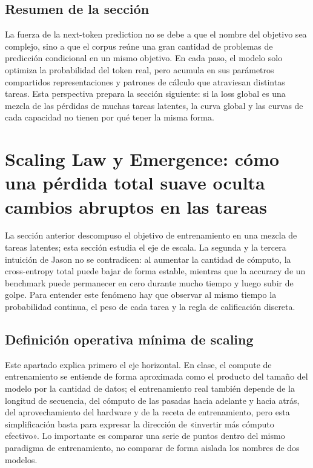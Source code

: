 \documentclass[a4paper]{article}
\begin{document}
\subsection{Resumen de la sección}

La fuerza de la next-token prediction no se debe a que el nombre del objetivo sea complejo, sino a que el corpus reúne una gran cantidad de problemas de predicción condicional en un mismo objetivo. En cada paso, el modelo solo optimiza la probabilidad del token real, pero acumula en sus parámetros compartidos representaciones y patrones de cálculo que atraviesan distintas tareas. Esta perspectiva prepara la sección siguiente: si la loss global es una mezcla de las pérdidas de muchas tareas latentes, la curva global y las curvas de cada capacidad no tienen por qué tener la misma forma.
\section{Scaling Law y Emergence: cómo una pérdida total suave oculta cambios abruptos en las tareas}

La sección anterior descompuso el objetivo de entrenamiento en una mezcla de tareas latentes; esta sección estudia el eje de escala. La segunda y la tercera intuición de Jason no se contradicen: al aumentar la cantidad de cómputo, la cross-entropy total puede bajar de forma estable, mientras que la accuracy de un benchmark puede permanecer en cero durante mucho tiempo y luego subir de golpe. Para entender este fenómeno hay que observar al mismo tiempo la probabilidad continua, el peso de cada tarea y la regla de calificación discreta.

\subsection{Definición operativa mínima de scaling}

Este apartado explica primero el eje horizontal. En clase, el compute de entrenamiento se entiende de forma aproximada como el producto del tamaño del modelo por la cantidad de datos; el entrenamiento real también depende de la longitud de secuencia, del cómputo de las pasadas hacia adelante y hacia atrás, del aprovechamiento del hardware y de la receta de entrenamiento, pero esta simplificación basta para expresar la dirección de «invertir más cómputo efectivo». Lo importante es comparar una serie de puntos dentro del mismo paradigma de entrenamiento, no comparar de forma aislada los nombres de dos modelos.
\end{document}

